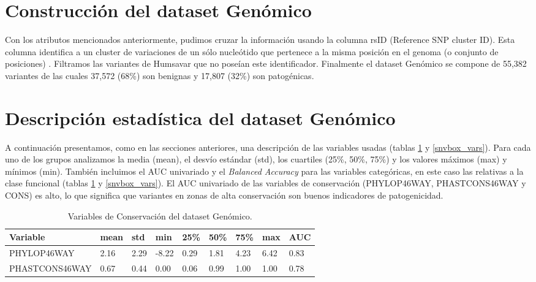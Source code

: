 \section{Construcción del dataset Genómico}

Con los atributos mencionados anteriormente, pudimos cruzar la información usando la columna rsID (Reference SNP cluster ID). Esta columna identifica a un cluster de variaciones de un sólo nucleótido que pertenece a la misma posición en el genoma (o conjunto de posiciones) \cite{Ostell2007}. Filtramos las variantes de Humsavar que no poseían este identificador. Finalmente el dataset Genómico se compone de 55,382 variantes de las cuales 37,572 (68\%) son benignas y 17,807 (32\%) son patogénicas. 

\section{Descripción estadística del dataset Genómico}

A continuación presentamos, como en las secciones anteriores, una descripción de las variables usadas (tablas \ref{conservacion_vars} y \ref{snvbox_vars}). Para cada uno de los grupos analizamos la media (mean), el desvío estándar (std), los cuartiles (25\%, 50\%, 75\%) y los valores máximos (max) y mínimos (min). También incluimos el AUC univariado y el \textit{Balanced Accuracy} para las variables categóricas, en este caso las relativas a la clase funcional (tablas \ref{conservacion_vars} y \ref{snvbox_vars}). El AUC univariado de las variables de conservación (PHYLOP46WAY, PHASTCONS46WAY y CONS) es alto, lo que significa que variantes en zonas de alta conservación son buenos indicadores de patogenicidad.


\begin{table}[H]
\centering
\begin{tabular}{|l|l|l|l|l|l|l|l|l|}
\hline
Variable & mean & std & min & 25\%  & 50\% & 75\%  & max & AUC \\ \hline
PHYLOP46WAY & 2.16 &  2.29 & -8.22 &  0.29 &  1.81 &  4.23 &  6.42 & 0.83 \\ \hline
PHASTCONS46WAY & 0.67 & 0.44 &  0.00 &  0.06 &  0.99 &  1.00 &  1.00 & 0.78 \\ \hline
\end{tabular}
\caption{Variables de Conservación del dataset Genómico.}
\label{conservacion_vars}
\end{table}

